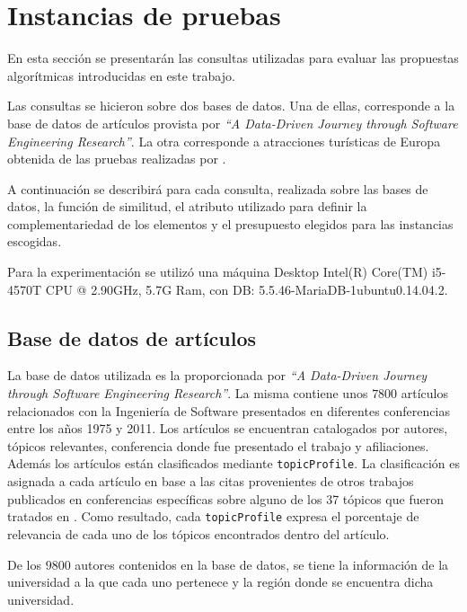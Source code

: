 \section{Instancias de pruebas}\label{sect:busquedas}
En esta sección se presentarán las consultas utilizadas para evaluar las propuestas algorítmicas introducidas en este trabajo. 

Las consultas se hicieron sobre dos bases de datos. Una de ellas, corresponde a la base de datos de artículos provista por \textit{\textquotedblleft A Data-Driven Journey through Software Engineering Research\textquotedblright}\cite{dataDrive}. La otra corresponde a atracciones turísticas de Europa obtenida de las pruebas realizadas por \cite{journals/tkde/Amer-YahiaBCFMZ14}.

A continuación se describirá para cada consulta, realizada sobre las bases de datos, la función de similitud, el atributo utilizado para definir la complementariedad de los elementos y el presupuesto elegidos para las instancias escogidas. 

Para la experimentación se utilizó una máquina Desktop Intel(R) Core(TM) i5-4570T CPU @ 2.90GHz, 5.7G Ram, con DB: 5.5.46-MariaDB-1ubuntu0.14.04.2.

\subsection{Base de datos de artículos}
La base de datos utilizada es la proporcionada por \textit{\textquotedblleft A Data-Driven Journey through Software Engineering Research\textquotedblright}\cite{dataDrive}. La misma contiene unos $7800$ artículos relacionados con la Ingeniería de Software presentados en diferentes conferencias entre los años 1975 y 2011. Los artículos se encuentran catalogados por autores, tópicos relevantes, conferencia donde fue presentado el trabajo y afiliaciones. Además los artículos están clasificados mediante \texttt{topicProfile}. La clasificación es asignada a cada artículo en base a las citas provenientes de otros trabajos publicados en conferencias específicas sobre alguno de los 37 tópicos que fueron tratados en \cite{dataDrive}. Como resultado, cada \texttt{topicProfile} expresa el porcentaje de relevancia de cada uno de los tópicos encontrados dentro del artículo. 

De los $9800$ autores contenidos en la base de datos, se tiene la información de la universidad a la que cada uno pertenece y la región donde se encuentra dicha universidad.

